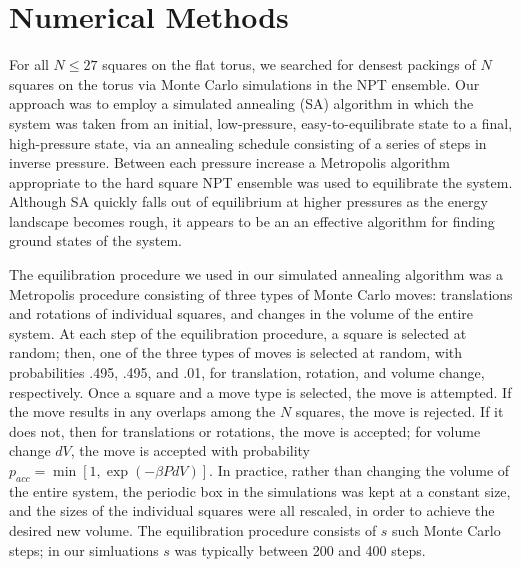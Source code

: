 \documentclass{umthesis}          %
\begin{document}
\section{Numerical Methods}
\label{sec:numerical}

For all $N \leq 27$ squares on the flat torus, we searched for densest packings of $N$ squares on the torus via Monte Carlo simulations in the NPT ensemble.  Our approach was to employ a simulated annealing (SA) algorithm in which the system was taken from an initial, low-pressure, easy-to-equilibrate state to a final, high-pressure state, via an annealing schedule consisting of a series of steps in inverse pressure.  Between each pressure increase a Metropolis algorithm appropriate to the hard square NPT ensemble was used to equilibrate the system.  Although SA quickly falls out of equilibrium at higher pressures as the energy landscape becomes rough, it appears to be an an effective algorithm for finding ground states of the system.  


The equilibration procedure we used in our simulated annealing algorithm was a Metropolis procedure consisting of three types of Monte Carlo moves:  translations and rotations of individual squares, and changes in the volume of the entire system.  At each step of the equilibration procedure, a square is selected at random; then, one of the three types of moves is selected at random, with probabilities .495, .495, and .01, for translation, rotation, and volume change, respectively.  Once a square and a move type is selected, the move is attempted.  If the move results in any overlaps among the $N$ squares, the move is rejected.  If it does not, then for translations or rotations, the move is accepted; for volume change $dV$, the move is accepted with probability $p_{acc}=\min[1,\exp(-\beta P dV)]$.  In practice, rather than changing the volume of the entire system, the periodic box in the simulations was kept at a constant size, and the sizes of the individual squares were all rescaled, in order to achieve the desired new volume. The equilibration procedure consists of $s$ such Monte Carlo steps; in our simluations $s$ was typically between 200 and 400 steps.  
\end{document}
